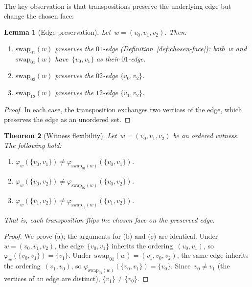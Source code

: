 \documentclass[11pt,a4paper]{article}
\theoremstyle{plain}
\newtheorem{theorem}{Theorem}[section]
\newtheorem{lemma}[theorem]{Lemma}
\theoremstyle{definition}
\theoremstyle{remark}
\newcommand{\swapAB}{\mathrm{swap}_{01}}
\newcommand{\swapAC}{\mathrm{swap}_{02}}
\newcommand{\swapBC}{\mathrm{swap}_{12}}
\newcommand{\chosenface}{\varphi}
\begin{document}
The key observation is that transpositions preserve the underlying edge
but change the chosen face:

\begin{lemma}[Edge preservation]
\label{lem:edge-preservation}
Let~$w = (v_0, v_1, v_2)$. Then:
\begin{enumerate}[label=\textup{(\alph*)},nosep]
  \item $\swapAB(w)$ preserves the $01$-edge
        (Definition~\ref{def:chosen-face}): both~$w$ and~$\swapAB(w)$
        have~$\{v_0, v_1\}$ as their $01$-edge.
  \item $\swapAC(w)$ preserves the $02$-edge $\{v_0, v_2\}$.
  \item $\swapBC(w)$ preserves the $12$-edge $\{v_1, v_2\}$.
\end{enumerate}
\end{lemma}

\begin{proof}
In each case, the transposition exchanges two vertices of the edge,
which preserves the edge as an unordered set.
\end{proof}

\begin{theorem}[Witness flexibility]
\label{thm:flexibility}
Let~$w = (v_0, v_1, v_2)$ be an ordered witness. The following hold:
\begin{enumerate}[label=\textup{(\alph*)},nosep]
  \item $\chosenface_w(\{v_0, v_1\}) \neq
        \chosenface_{\swapAB(w)}(\{v_0, v_1\})$.
  \item $\chosenface_w(\{v_0, v_2\}) \neq
        \chosenface_{\swapAC(w)}(\{v_0, v_2\})$.
  \item $\chosenface_w(\{v_1, v_2\}) \neq
        \chosenface_{\swapBC(w)}(\{v_1, v_2\})$.
\end{enumerate}
That is, each transposition flips the chosen face on the preserved edge.
\end{theorem}

\begin{proof}
We prove (a); the arguments for (b) and (c) are identical.
Under~$w = (v_0, v_1, v_2)$, the edge~$\{v_0, v_1\}$ inherits the
ordering~$(v_0, v_1)$, so $\chosenface_w(\{v_0, v_1\}) = \{v_1\}$.
Under~$\swapAB(w) = (v_1, v_0, v_2)$, the same edge inherits the
ordering~$(v_1, v_0)$, so
$\chosenface_{\swapAB(w)}(\{v_0, v_1\}) = \{v_0\}$.
Since~$v_0 \neq v_1$ (the vertices of an edge are distinct),
$\{v_1\} \neq \{v_0\}$.
\end{proof}
\end{document}
